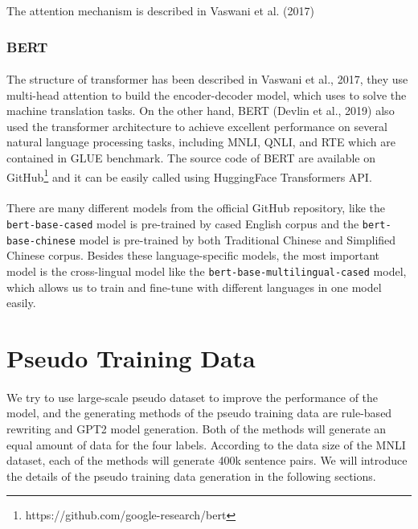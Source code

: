 \documentclass{article}
\begin{document}
\begin{CJK*}{UTF8}{bkai}
The attention mechanism is described in Vaswani et al. (2017)

\subsubsection{BERT}
\paragraph{}
The structure of transformer\cite{vaswani2017attention} has been described in Vaswani et al., 2017, they use multi-head attention to build the encoder-decoder model, which uses to solve the machine translation tasks. On the other hand, BERT\cite{devlin2018bert} (Devlin et al., 2019) also used the transformer architecture to achieve excellent performance on several natural language processing tasks, including MNLI, QNLI, and RTE which are contained in GLUE benchmark. The source code of BERT are available on GitHub\footnote{https://github.com/google-research/bert} and it can be easily called using HuggingFace Transformers API\cite{wolf-etal-2020-transformers}.

\paragraph{}
There are many different models from the official GitHub repository, like the \texttt{bert-base-cased} model is pre-trained by cased English corpus and the \texttt{bert-base-chinese} model is pre-trained by both Traditional Chinese and Simplified Chinese corpus. Besides these language-specific models, the most important model is the cross-lingual model like the \texttt{bert-base-multilingual-cased} model, which allows us to train and fine-tune with different languages in one model easily.

\section{Pseudo Training Data} \label{section:pseudo}
\paragraph{}
We try to use large-scale pseudo dataset to improve the performance of the model, and the generating methods of the pseudo training data are rule-based rewriting and GPT2 model generation. Both of the methods will generate an equal amount of data for the four labels. According to the data size of the MNLI dataset, each of the methods will generate 400k sentence pairs. We will introduce the details of the pseudo training data generation in the following sections.


\end{CJK*}
\end{document}
